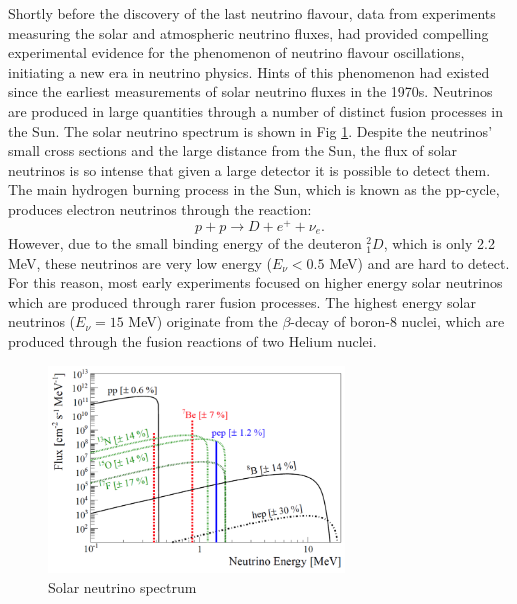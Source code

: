 Shortly before the discovery of the last neutrino flavour, data from experiments measuring the solar and atmospheric neutrino fluxes, had provided compelling experimental evidence for the phenomenon of neutrino flavour oscillations, initiating a new era in neutrino physics. Hints of this phenomenon had existed since the earliest measurements of solar neutrino fluxes in the 1970s. Neutrinos are produced in large quantities through a number of distinct fusion processes in the Sun. The solar neutrino spectrum is shown in Fig \ref{fig:Solar-Neutrino-Spectrum}.  Despite the neutrinos' small cross sections and the large distance from the Sun, the flux of solar neutrinos is so intense that given a large detector it is possible to detect them. The main hydrogen burning process in the Sun, which is known as the pp-cycle, produces electron neutrinos through the reaction:
\begin{equation}
    p+p \rightarrow D+e^+ +\nu_e .
\end{equation}
However, due to the small binding energy of the deuteron $^2_1D$, which is only 2.2 MeV, these neutrinos are very low energy ($E_\nu<0.5$ MeV) and are hard to detect. For this reason, most early experiments focused on higher energy solar neutrinos which are produced through rarer fusion processes.  The highest energy solar neutrinos ($E_\nu = 15$ MeV) originate from the $\beta$-decay of boron-8 nuclei, which are produced through the fusion reactions of two Helium nuclei.

\begin{figure}[t]
     \centering
     \includegraphics[width=0.7\textwidth]{figures/ch2-Theory/nu_spectrum.png}
     \caption[Solar neutrino spectrum]{Solar neutrino spectrum \cite{Borexino:2014lrx}}
        \label{fig:Solar-Neutrino-Spectrum}
\end{figure}


